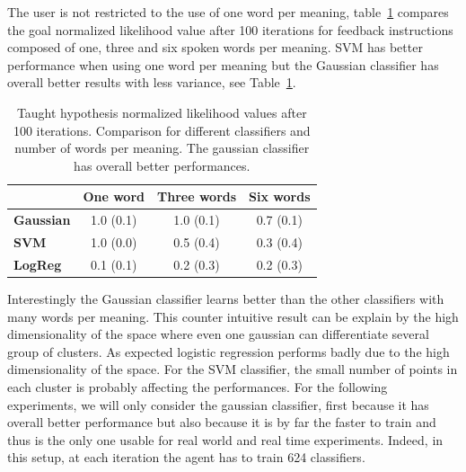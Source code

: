The user is not restricted to the use of one word per meaning, table~\ref{tab:1} compares the goal normalized likelihood value after 100 iterations for feedback instructions composed of one, three and six spoken words per meaning. SVM has better performance when using one word per meaning but the Gaussian classifier has overall better results with less variance, see Table~\ref{tab:1}. 
%
\begin{table}[htbp]
\caption{Taught hypothesis normalized likelihood values after 100 iterations. Comparison for different classifiers and number of words per meaning. The gaussian classifier has overall better performances.}
\label{tab:1}
\centering
\begin{tabular}{|l|c|c|c|}
\hline
&\textbf{One word}&\textbf{Three words}&\textbf{Six words}\\\hline
\textbf{Gaussian}&1.0 (0.1)&1.0 (0.1)&0.7 (0.1)\\\hline
\textbf{SVM}&1.0 (0.0)&0.5 (0.4)&0.3 (0.4)\\\hline
\textbf{LogReg}&0.1 (0.1)&0.2 (0.3)&0.2 (0.3)\\\hline
\end{tabular}
\end{table}
%
Interestingly the Gaussian classifier learns better than the other classifiers with many words per meaning. This counter intuitive result can be explain by the high dimensionality of the space where even one gaussian can differentiate several group of clusters. As expected logistic regression performs badly due to the high dimensionality of the space. For the SVM classifier, the small number of points in each cluster is probably affecting the performances. For the following experiments, we will only consider the gaussian classifier, first because it has overall better performance but also because it is by far the faster to train and thus is the only one usable for real world and real time experiments. Indeed, in this setup, at each iteration the agent has to train 624 classifiers.
%
